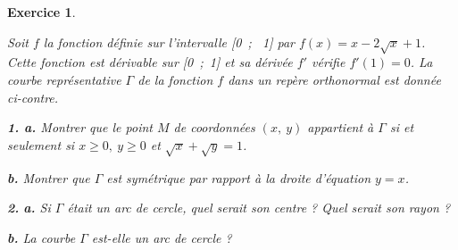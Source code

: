 \documentclass[12pt,a4paper,french]{article}
\theoremstyle{break}
\newtheorem{exercice}{Exercice}
\theoremstyle{nonumberplain}
\theoremstyle{nonumberbreak}
\begin{document}
\begin{exercice}
  ~\\[-\baselineskip]
  \parbox[c]{0.5\textwidth}{Soit $f$ la fonction définie sur
    l'intervalle [0~;~ 1] par $f(x) = x - 2\sqrt{x} + 1$. Cette fonction
    est dérivable sur [0~;~1] et sa dérivée $f'$ vérifie $f'(1) = 0$. La
    courbe représentative
    $\Gamma$ de la fonction $f$ dans un repère orthonormal est donnée
    ci-contre.

    \textbf{1. a.}  Montrer que le point $M$ de coordonnées $(x,~y)$
    appartient à $\Gamma$ si et seulement si $x \geqslant 0,~ y
    \geqslant 0$ et $\sqrt{x} + \sqrt{y} = 1$.

    \textbf{b.} Montrer que $\Gamma$ est symétrique par rapport à la
  droite d'équation $y = x$.} \hfill
  \parbox[c]{0.5\textwidth}{\begin{center}
  \end{center}}

  \textbf{2.} \textbf{a.}  Si $\Gamma$ était un arc de cercle, quel
  serait son centre ? Quel serait son rayon ?

  \textbf{b.}  La courbe $\Gamma$ est-elle un arc de cercle ?
\end{exercice}
\end{document}
